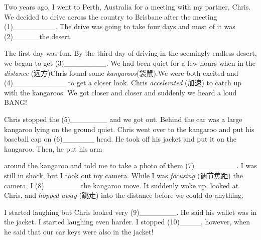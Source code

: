 \documentclass{ctexart}
\begin{document}
Two years ago, I went to Perth, Australia for a meeting with my partner, 
Chris. We decided to drive across the country to Brisbane after the meeting 
(1){\_}{\_}{\_}{\_}{\_}{\_}{\_}{\_}. The drive was going to take four days 
and most of it was (2){\_}{\_}{\_}{\_}{\_}the desert. 

The first day was fun. By the third day of driving in the seemingly endless 
desert, we began to get (3){\_}{\_}{\_}{\_}{\_}{\_}{\_}{\_}. We had been 
quiet for a few hours when in the \textit{distance }(远方)Chris found some 
\textit{kangaroos}(袋鼠).We were both excited and (4){\_}{\_}{\_}{\_}{\_}{\_}{\_}{\_}{\_}{\_} 
to get a closer look. Chris \textit{accelerated} (加速) to catch up with the kangaroos. We got 
closer and closer and suddenly we heard a loud BANG!

Chris stopped the (5){\_}{\_}{\_}{\_}{\_}{\_}{\_} and we got out. Behind the 
car was a large kangaroo lying on the ground quiet. Chris went over to the 
kangaroo and put his baseball cap on (6){\_}{\_}{\_}{\_}{\_}{\_} head. He 
took off his jacket and put it on the kangaroo. Then, he put his arm

around the kangaroo and told me to take a photo of them 
(7){\_}{\_}{\_}{\_}{\_}{\_}{\_}{\_}. I was still in shock, but I took out my 
camera. While I was \textit{focusing} (调节焦距) the camera, I 
(8){\_}{\_}{\_}{\_}{\_}{\_}{\_}the kangaroo move. It suddenly woke up, 
looked at Chris, and \textit{hopped away} (跳走) into the distance before we could do anything.

I started laughing but Chris looked very (9){\_}{\_}{\_}{\_}{\_}{\_}{\_}. He 
said his wallet was in the jacket. I started laughing even harder. I stopped 
(10){\_}{\_}{\_}{\_}, however, when he said that our car keys were also in 
the jacket!
\end{document}
